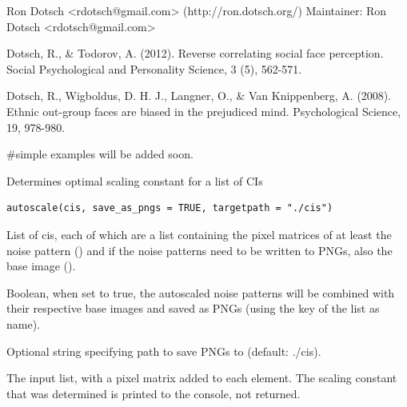 \documentclass[letterpaper]{book}
\begin{document}
%
\begin{Author}
Ron Dotsch <rdotsch@gmail.com> (http://ron.dotsch.org/)
Maintainer: Ron Dotsch <rdotsch@gmail.com>
\end{Author}
%
\begin{References}
Dotsch, R., \& Todorov, A. (2012). Reverse correlating social face perception. Social Psychological and Personality Science, 3 (5), 562-571.

Dotsch, R., Wigboldus, D. H. J., Langner, O., \& Van Knippenberg, A. (2008). Ethnic out-group faces are biased in the prejudiced mind. Psychological Science, 19, 978-980.
\end{References}
%
\begin{Examples}
\begin{ExampleCode}
#simple examples will be added soon.
\end{ExampleCode}
\end{Examples}
%
\begin{Description}
Determines optimal scaling constant for a list of CIs
\end{Description}
%
\begin{Usage}
\begin{verbatim}
autoscale(cis, save_as_pngs = TRUE, targetpath = "./cis")
\end{verbatim}
\end{Usage}
%
\begin{Arguments}
\begin{ldescription}
\item[\code{cis}] List of cis, each of which are a list containing the pixel matrices of at least the noise pattern () and if the noise patterns need to be written to PNGs, also the base image ().

\item[\code{save\_as\_pngs}] Boolean, when set to true, the autoscaled noise patterns will be combined with their respective base images and saved as PNGs (using the key of the list as name).

\item[\code{targetpath}] Optional string specifying path to save PNGs to (default: ./cis).
\end{ldescription}
\end{Arguments}
%
\begin{Value}
The input  list, with a  pixel matrix added to each element. The
scaling constant that was determined is printed to the console, not returned.
\end{Value}
\end{document}
